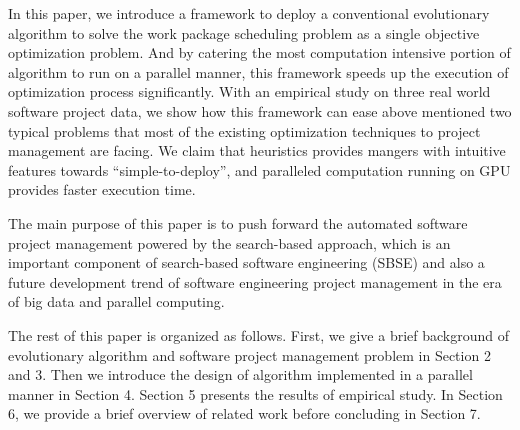 In this paper, we introduce a framework to deploy a conventional evolutionary algorithm to solve the work package scheduling problem as a single objective optimization problem. 
And by catering the most computation intensive portion of algorithm to run on a parallel manner, this framework speeds up the execution of optimization process significantly.
With an empirical study on three real world software project data, we show how this framework can ease above mentioned two typical problems that most of the existing optimization techniques to project management are facing.
We claim that heuristics provides mangers with intuitive features towards ``simple-to-deploy'', and paralleled computation running on GPU provides faster execution time.

The main purpose of this paper is to push forward the automated software project management powered by the search-based approach, which is an important component of search-based software engineering (SBSE) and also a future development trend of software engineering project management in the era of big data and parallel computing.

The rest of this paper is organized as follows. First, we give a brief background of evolutionary algorithm and software project management problem in Section 2 and 3. Then we introduce the design of algorithm implemented in a parallel manner in Section 4. Section 5 presents the results of empirical study. In Section 6, we provide a brief overview of related work before concluding in Section 7.






